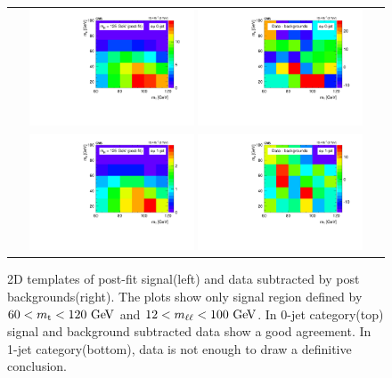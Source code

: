 \begin{figure}[htp] 
\centering 
\begin{tabular}{c} 
\includegraphics[width=0.45\textwidth]{figures/2d_postfit_0j_125_sig_paper.pdf}          
\includegraphics[width=0.45\textwidth]{figures/2d_postfit_0j_125_dataminusbkg_paper.pdf}          
\\
\includegraphics[width=0.45\textwidth]{figures/2d_postfit_1j_125_sig_paper.pdf}          
\includegraphics[width=0.45\textwidth]{figures/2d_postfit_1j_125_dataminusbkg_paper.pdf}          
\end{tabular} 
\caption{2D templates of post-fit signal(left) and data subtracted by post backgrounds(right). 
The plots show only signal region defined by $60<m_{\mathrm{t}}<120~\mathrm{Ge\kern -0.1em V}$ and $12<m_{\ell\ell}<100~\mathrm{Ge\kern -0.1em V}$.
In 0-jet category(top) signal and background subtracted data show a good agreement.  
In 1-jet category(bottom), data is not enough to draw a definitive conclusion. }
\label{fig:post2D} 
\end{figure} 


